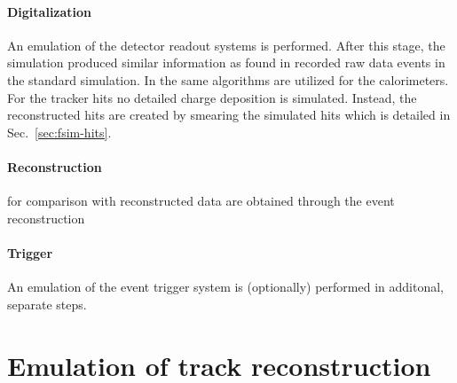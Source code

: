 \paragraph{Digitalization} An emulation of the detector readout systems is performed. After this stage, the simulation produced similar information as found in recorded raw data events in the standard simulation. In \FSIM the same algorithms are utilized for the calorimeters. For the  tracker hits no detailed charge deposition is simulated. Instead, the reconstructed hits are created by smearing the simulated hits which is detailed in Sec.~\ref{sec:fsim-hits}.

\paragraph{Reconstruction} for comparison with reconstructed data are obtained through the event reconstruction
\paragraph{Trigger} An emulation of the event trigger system is (optionally) performed in additonal, separate steps.



\section{Emulation of track reconstruction}
\label{sec:fsim-tracking}


